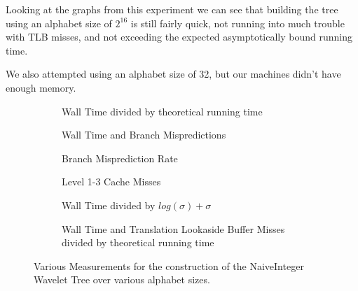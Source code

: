 Looking at the graphs from this experiment we can see that building the tree using an alphabet size of $2^{16}$ is still fairly quick, not running into much trouble with TLB misses, and not exceeding the expected asymptotically bound running time.

We also attempted using an alphabet size of 32, but our machines didn't have enough memory.


\begin{figure}\tiny
	\begin{subfigure}{0.48\textwidth}
		
		\caption{Wall Time divided by theoretical running time}
		\label{fig:naiveIntegerAlphabetSize_WallTime}
	\end{subfigure}
	\hfill
	\begin{subfigure}{0.48\textwidth}
		
		\caption{Wall Time and Branch Mispredictions}
		\label{fig:naiveIntegerAlphabetSize_WallTime_BM}
	\end{subfigure}	
	
	\begin{subfigure}{0.48\textwidth}
		
		\caption{Branch Misprediction Rate}
		\label{fig:naiveIntegerAlphabetSize_BMRate}
	\end{subfigure}
	\hfill
	\begin{subfigure}{0.48\textwidth}
		
		\caption{Level 1-3 Cache Misses}
		\label{fig:naiveIntegerAlphabetSize_CM}
	\end{subfigure}
	
	\begin{subfigure}{0.48\textwidth}
		
		\caption{Wall Time divided by $log(\sigma) + \sigma$}
		\label{fig:naiveIntegerAlphabetSize_WallTime_plusSigma}
	\end{subfigure}
	\hfill
	\begin{subfigure}{0.48\textwidth}
		
		\caption{Wall Time and Translation Lookaside Buffer Misses divided by theoretical running time}
		\label{fig:naiveIntegerAlphabetSize_WallTime_TLB}
	\end{subfigure}
	\caption{Various Measurements for the construction of the NaiveInteger Wavelet Tree over various alphabet sizes.}
	\label{fig:naiveIntegerAlphabetSize}
\end{figure}
\restoregeometry
\clearpage

